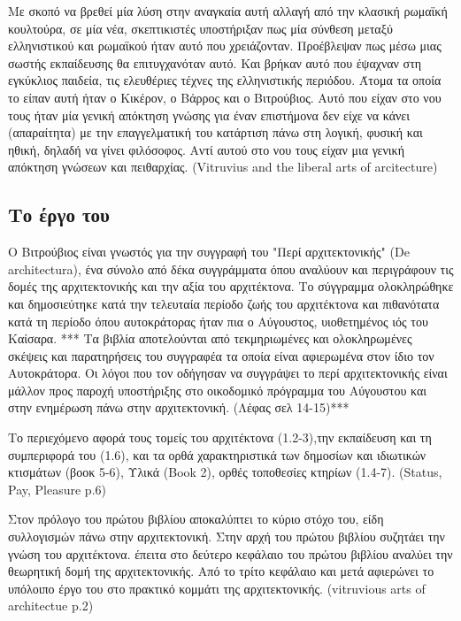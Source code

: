 Με σκοπό να βρεθεί μία λύση στην αναγκαία αυτή αλλαγή από την κλασική ρωμαϊκή 
κουλτούρα, σε μία νέα, σκεπτικιστές υποστήριξαν πως μία σύνθεση μεταξύ 
ελληνιστικού και ρωμαϊκού ήταν αυτό που χρειάζονταν. Προέβλεψαν πως μέσω μιας 
σωστής εκπαίδευσης θα επιτυγχανόταν αυτό. Και βρήκαν αυτό που έψαχναν στη 
εγκύκλιος παιδεία, τις ελευθέριες τέχνες της ελληνιστικής περιόδου. Άτομα τα 
οποία το είπαν αυτή ήταν ο Κικέρον, ο Βάρρος και ο Βιτρούβιος. Αυτό που είχαν 
στο νου τους ήταν μία γενική απόκτηση γνώσης για έναν επιστήμονα δεν είχε να 
κάνει (απαραίτητα) με την επαγγελματική του κατάρτιση πάνω στη λογική, φυσική 
και ηθική, δηλαδή να γίνει φιλόσοφος. Αντί αυτού στο νου τους είχαν μια γενική 
απόκτηση γνώσεων και πειθαρχίας. (Vitruvius and the liberal arts of 
arcitecture)

\subsection{Το έργο του} 

Ο Βιτρούβιος είναι γνωστός για την συγγραφή του "Περί αρχιτεκτονικής" (De 
architectura), ένα σύνολο από δέκα συγγράμματα όπου αναλύουν και περιγράφουν 
τις δομές της αρχιτεκτονικής και την αξία του αρχιτέκτονα.
Το σύγγραμμα ολοκληρώθηκε και δημοσιεύτηκε κατά την τελευταία περίοδο ζωής του 
αρχιτέκτονα και πιθανότατα κατά τη περίοδο όπου αυτοκράτορας ήταν πια ο 
Αύγουστος, υιοθετημένος ιός του Καίσαρα. ***
Τα βιβλία αποτελούνται από τεκμηριωμένες και ολοκληρωμένες σκέψεις και 
παρατηρήσεις του συγγραφέα τα οποία είναι αφιερωμένα στον ίδιο τον Αυτοκράτορα. 
Οι λόγοι που τον οδήγησαν να συγγράψει το περί αρχιτεκτονικής είναι μάλλον προς 
παροχή υποστήριξης στο οικοδομικό πρόγραμμα του Αύγουστου και στην ενημέρωση 
πάνω στην αρχιτεκτονική. (Λέφας σελ 14-15)***

Το περιεχόμενο αφορά τους τομείς του αρχιτέκτονα (1.2-3),την εκπαίδευση και τη 
συμπεριφορά του (1.6), και τα ορθά χαρακτηριστικά των δημοσίων και ιδιωτικών 
κτισμάτων (βοοκ 5-6), Υλικά (Book 2), ορθές τοποθεσίες κτηρίων (1.4-7). 
(Status, Pay, Pleasure p.6)

Στον πρόλογο του πρώτου βιβλίου αποκαλύπτει το κύριο στόχο του, είδη 
συλλογισμών πάνω στην αρχιτεκτονική. Στην αρχή του πρώτου βιβλίου συζητάει την 
γνώση του αρχιτέκτονα. έπειτα στο δεύτερο κεφάλαιο του πρώτου βιβλίου αναλύει 
την θεωρητική δομή της αρχιτεκτονικής. Από το τρίτο κεφάλαιο και μετά αφιερώνει 
το υπόλοιπο έργο του στο πρακτικό κομμάτι της αρχιτεκτονικής. (vitruvious arts 
of architectue p.2)

